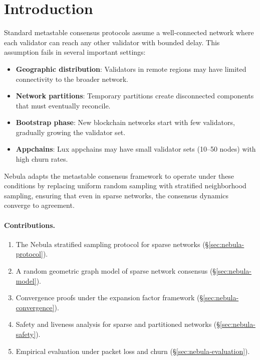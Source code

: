 \section{Introduction}

\label{sec:nebula-introduction}

Standard metastable consensus protocols assume a well-connected network where each
validator can reach any other validator with bounded delay. This assumption fails in
several important settings:

\begin{itemize}[nosep]
\item \textbf{Geographic distribution}: Validators in remote regions may have limited
connectivity to the broader network.
\item \textbf{Network partitions}: Temporary partitions create disconnected components
that must eventually reconcile.
\item \textbf{Bootstrap phase}: New blockchain networks start with few validators,
gradually growing the validator set.
\item \textbf{Appchains}: Lux appchains may have small validator sets (10--50 nodes)
with high churn rates.
\end{itemize}

Nebula adapts the metastable consensus framework to operate under these conditions by
replacing uniform random sampling with stratified neighborhood sampling, ensuring that
even in sparse networks, the consensus dynamics converge to agreement.

\paragraph{Contributions.}
\begin{enumerate}[nosep]
\item The Nebula stratified sampling protocol for sparse networks (\S\ref{sec:nebula-protocol}).
\item A random geometric graph model of sparse network consensus (\S\ref{sec:nebula-model}).
\item Convergence proofs under the expansion factor framework (\S\ref{sec:nebula-convergence}).
\item Safety and liveness analysis for sparse and partitioned networks (\S\ref{sec:nebula-safety}).
\item Empirical evaluation under packet loss and churn (\S\ref{sec:nebula-evaluation}).
\end{enumerate}

